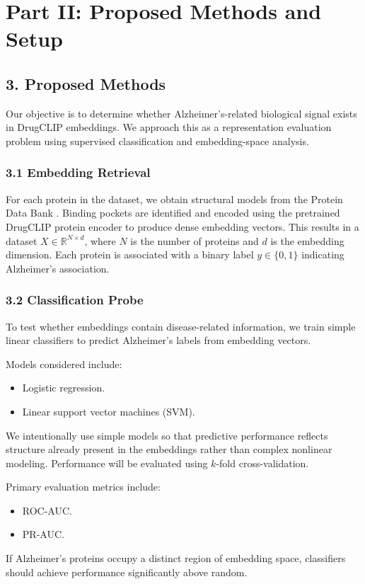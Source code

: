 \documentclass{article}
\begin{document}
\section*{Part II: Proposed Methods and Setup}

\subsection*{3. Proposed Methods}
Our objective is to determine whether Alzheimer's-related biological signal exists in DrugCLIP embeddings. We approach this as a representation evaluation problem using supervised classification and embedding-space analysis.

\subsubsection*{3.1 Embedding Retrieval}
For each protein in the dataset, we obtain structural models from the Protein Data Bank \cite{pdb2000}. Binding pockets are identified \cite{method2018} and encoded using the pretrained DrugCLIP protein encoder to produce dense embedding vectors. This results in a dataset $X \in \mathbb{R}^{N \times d}$, where $N$ is the number of proteins and $d$ is the embedding dimension. Each protein is associated with a binary label $y \in \{0,1\}$ indicating Alzheimer's association.

\subsubsection*{3.2 Classification Probe}
To test whether embeddings contain disease-related information, we train simple linear classifiers to predict Alzheimer's labels from embedding vectors.

Models considered include:
\begin{itemize}
    \item Logistic regression.
    \item Linear support vector machines (SVM).
\end{itemize}

We intentionally use simple models so that predictive performance reflects structure already present in the embeddings rather than complex nonlinear modeling.
Performance will be evaluated using $k$-fold cross-validation.

Primary evaluation metrics include:
\begin{itemize}
    \item ROC-AUC.
    \item PR-AUC.
\end{itemize}
If Alzheimer's proteins occupy a distinct region of embedding space, classifiers should achieve performance significantly above random.
\end{document}
